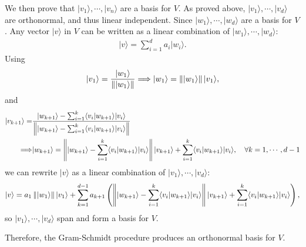\documentclass[en]{sol-man}
\begin{document}
\begin{sol}
    We then prove that $\lvert v_1\rangle,\cdots,\lvert v_n\rangle$ are a basis for $V$.
    As proved above, $\lvert v_1\rangle,\cdots,\lvert v_d\rangle$ are orthonormal, and thus linear independent. Since $\lvert w_1\rangle,\cdots,\lvert w_d\rangle$ are a basis for $V$. Any vector $\lvert v\rangle$ in $V$ can be written as a linear combination of $\lvert w_1\rangle,\cdots,\lvert w_d\rangle$:
    \begin{align}
        \lvert v\rangle=\sum_{i=1}^da_i\lvert w_i\rangle.
    \end{align}
    Using
    \begin{align}
        \label{E2.8-w1-v1}
        \lvert v_1\rangle=\frac{\lvert w_1\rangle}{\left\lVert\lvert w_1\rangle\right\rVert}\Longrightarrow \lvert w_1\rangle=\left\lVert\lvert w_1\rangle\right\rVert\lvert v_1\rangle,\\
    \end{align}
    and
    \begin{align}
        \label{E2.8-w-v}
        \notag\lvert v_{k+1}\rangle=&\frac{\lvert w_{k+1}\rangle-\sum_{i=1}^k\langle v_i\vert w_{k+1}\rangle\lvert v_i\rangle}{\left\lVert\lvert w_{k+1}\rangle-\sum_{i=1}^k\langle v_i\vert w_{k+1}\rangle\lvert v_i\rangle\right\rVert}\\
        \Longrightarrow&\lvert w_{k+1}\rangle=\left\lVert\lvert w_{k+1}\rangle-\sum_{i=1}^k\langle v_i\vert w_{k+1}\rangle\lvert v_i\rangle\right\rVert\lvert v_{k+1}\rangle+\sum_{i=1}^k\langle v_i\vert w_{k+1}\rangle\lvert v_i\rangle,\quad\forall k=1,\cdots,d-1
    \end{align}
    we can rewrite $\lvert v\rangle$ as a linear combination of $\lvert v_1\rangle,\cdots,\lvert v_d\rangle$:
    \begin{align}
        \lvert v\rangle=a_1\left\lVert\lvert w_1\rangle\right\rVert\lvert v_1\rangle+\sum_{k=1}^{d-1}a_{k+1}\left(\left\lVert\lvert w_{k+1}\rangle-\sum_{i=1}^k\langle v_i\vert w_{k+1}\rangle\lvert v_i\rangle\right\rVert\lvert v_{k+1}\rangle+\sum_{i=1}^k\langle v_i\vert w_{k+1}\rangle\lvert v_i\rangle\right),
    \end{align}
    so $\lvert v_1\rangle,\cdots,\lvert v_d\rangle$ span and form a basis for $V$.

    Therefore, the Gram-Schmidt procedure produces an orthonormal basis for $V$.
\end{sol}
\end{document}

